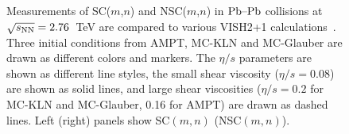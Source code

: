 \begin{figure}[!]
	\begin{center}
        \caption{Measurements of SC($m$,$n$) and NSC($m$,$n$) in $\textnormal{Pb--Pb}$ collisions at $\sqrt{s_{\textnormal{NN}}}=2.76$~TeV are compared to various VISH2+1 calculations~\cite{Zhu:2016puf}. Three initial conditions from AMPT, MC-KLN and MC-Glauber are drawn as different colors and markers. The $\eta/s$ parameters are shown as different line styles, the small shear viscosity ($\eta/s=0.08$) are shown as solid lines, and large shear viscosities ($\eta/s=0.2$ for MC-KLN and MC-Glauber, 0.16 for AMPT) are drawn as dashed lines. Left (right) panels show SC$(m,n)$ (NSC$(m,n)$).}
        \label{fig:Figure_4}
        \end{center}   
 \end{figure}
     
